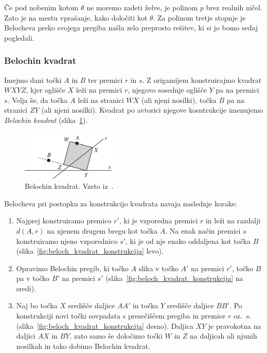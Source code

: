 Če pod nobenim kotom $\theta$ ne moremo zadeti želve, je polinom $p$ brez realnih ničel. Zato je na mestu vprašanje, kako določiti kot $\theta$. Za polinom tretje stopnje je Belocheva preko svojega pregiba našla zelo preprosto rešitev, ki si jo bomo sedaj pogledali.

\subsubsection*{Belochin kvadrat}

Imejmo dani točki $A$ in $B$ ter premici $r$ in $s$. Z origamijem konstruirajmo kvadrat $WXYZ$, kjer oglišče $X$ leži na premici $r$, njegovo sosednje oglišče $Y$ pa na premici $s$. Velja še, da točka $A$ leži na stranici $WX$ (ali njeni nosilki), točka $B$ pa na stranici $ZY$ (ali njeni nosilki). Kvadrat po avtorici njegove kosntrukcije imenujemo \emph{Belochin kvadrat} (slika~\ref{fig:beloch_kvadrat}).

\begin{figure}[h]
    \centering
    \includegraphics[width=0.4\textwidth]{images/kubična enačba/beloch_kvadrat.png}
    \caption[Belochin kvadrat]{Belochin kvadrat. Vzeto iz~\cite[str.\ 309]{hull2011}.}
    \label{fig:beloch_kvadrat}
\end{figure}

Belocheva pri postopku za konstrukcijo kvadrata navaja naslednje korake:
\begin{enumerate}
    \item Najprej konstruiramo premico $r'$, ki je vzporedna premici $r$ in leži na razdalji $d(A, r)$ na njenem drugem bregu kot točka $A$. Na enak način premici $s$ konstruiramo njeno vzporednico $s'$, ki je od nje enako oddaljena kot točka $B$ (slika~\ref{fig:beloch_kvadrat_konstrukcija} levo).
    \item Opravimo Belochin pregib, ki točko $A$ slika v točko $A'$ na premici $r'$, točko $B$ pa v točko $B'$ na premici $s'$ (slika~\ref{fig:beloch_kvadrat_konstrukcija} na sredi).
    \item Naj bo točka $X$ središče daljice $AA'$ in točka $Y$ središče daljice $BB'$. Po konstrukciji novi točki sovpadata s presečiščem pregiba in premice $r$ oz.\ $s$. (slika~\ref{fig:beloch_kvadrat_konstrukcija} desno). Daljica $XY$ je pravokotna na daljici $AX$ in $BY$, zato samo še določimo točki $W$ in $Z$ na daljicah ali njunih nosilkah in tako dobimo Belochin kvadrat.
\end{enumerate}

